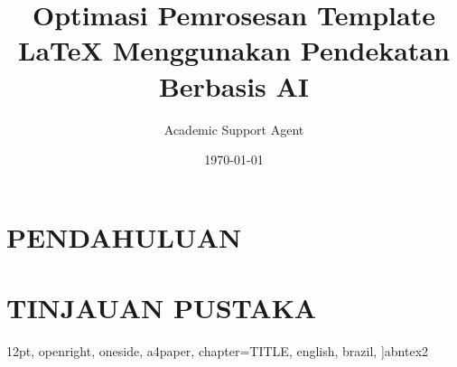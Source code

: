 \documentclass{abntex2}
\title{Optimasi Pemrosesan Template LaTeX Menggunakan Pendekatan Berbasis AI}
\author{Academic Support Agent}
\date{\today}
\begin{document}
\maketitle

\begin{abstract}

\end{abstract}

\chapter{PENDAHULUAN}


\chapter{TINJAUAN PUSTAKA}


	12pt,				%
	openright,			%
	oneside,			%
	a4paper,			%
	chapter=TITLE,		%
	english,			%
	brazil,				%
	]{abntex2}



\usepackage{lmodern}			%
\usepackage[T1]{fontenc}		%
\usepackage[utf8]{inputenc}		%
\usepackage{indentfirst}		%
\usepackage{color}				%
\usepackage{graphicx}			%
\usepackage{microtype} 			%
\usepackage{IFMG_Arcos} 		%
\usepackage{multicol}
\usepackage{multirow}
	
\usepackage{lipsum}				%
\end{document}
